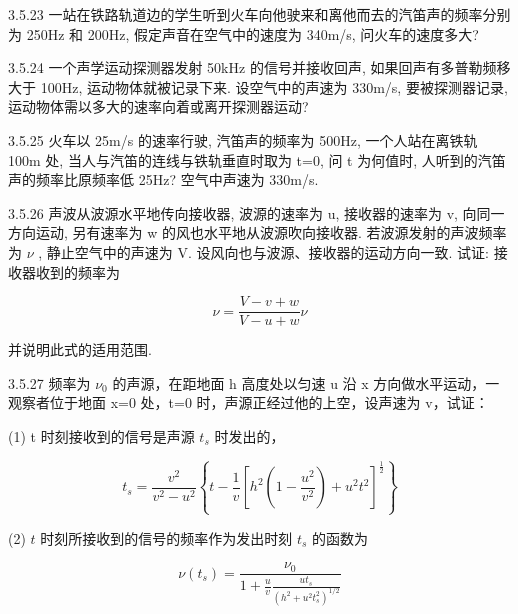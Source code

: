 \begin{problem}{3.5.23}
一站在铁路轨道边的学生听到火车向他驶来和离他而去的汽笛声的频率分别为 250Hz 和 200Hz, 假定声音在空气中的速度为 340m/s, 问火车的速度多大?
\end{problem}
\clearpage


\begin{problem}{3.5.24}
一个声学运动探测器发射 50kHz 的信号并接收回声, 如果回声有多普勒频移大于 100Hz, 运动物体就被记录下来. 设空气中的声速为 330m/s, 要被探测器记录, 运动物体需以多大的速率向着或离开探测器运动?
\end{problem}
\clearpage


\begin{problem}{3.5.25}
火车以 25m/s 的速率行驶, 汽笛声的频率为 500Hz, 一个人站在离铁轨 100m 处, 当人与汽笛的连线与铁轨垂直时取为 t=0, 问 t 为何值时, 人听到的汽笛声的频率比原频率低 25Hz? 空气中声速为 330m/s.
\end{problem}
\clearpage


\begin{problem}{3.5.26}
声波从波源水平地传向接收器, 波源的速率为 u, 接收器的速率为 v, 向同一方向运动, 另有速率为 w 的风也水平地从波源吹向接收器. 若波源发射的声波频率为 $\nu$ , 静止空气中的声速为 V. 设风向也与波源、接收器的运动方向一致. 试证: 接收器收到的频率为

\[
\nu = \frac {V - v + w}{V - u + w} \nu
\]

并说明此式的适用范围.
\end{problem}
\clearpage


\begin{problem}{3.5.27}
频率为 $\nu_{0}$ 的声源，在距地面 h 高度处以匀速 u 沿 x 方向做水平运动，一观察者位于地面 x=0 处，t=0 时，声源正经过他的上空，设声速为 v，试证：

(1) t 时刻接收到的信号是声源 $t_{s}$ 时发出的，

\[
t _ {s} = \frac {v ^ {2}}{v ^ {2} - u ^ {2}} \left\{t - \frac {1}{v} \left[ h ^ {2} \left(1 - \frac {u ^ {2}}{v ^ {2}}\right) + u ^ {2} t ^ {2} \right] ^ {\frac {1}{2}} \right\}
\]

(2) $t$ 时刻所接收到的信号的频率作为发出时刻 $t_s$ 的函数为

\[
\nu (t _ {s}) = \frac {\nu_ {0}}{1 + \frac {u}{v} \frac {u t _ {s}}{(h ^ {2} + u ^ {2} t _ {s} ^ {2}) ^ {1 / 2}}}
\]
\begin{center}

\end{center}
\end{problem}
\clearpage


